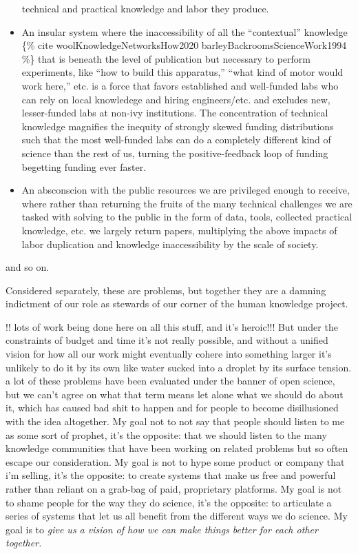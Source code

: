 \documentclass[nohyper]{tufte-book-jls}
\begin{document}
\begin{itemize}
  technical and practical knowledge and labor they produce.
\item
  An insular system where the inaccessibility of all the ``contextual''
  knowledge \{\% cite woolKnowledgeNetworksHow2020
  barleyBackroomsScienceWork1994 \%\} that is beneath the level of
  publication but necessary to perform experiments, like ``how to build
  this apparatus,'' ``what kind of motor would work here,'' etc. is a
  force that favors established and well-funded labs who can rely on
  local knowledege and hiring engineers/etc. and excludes new,
  lesser-funded labs at non-ivy institutions. The concentration of
  technical knowledge magnifies the inequity of strongly skewed funding
  distributions such that the most well-funded labs can do a completely
  different kind of science than the rest of us, turning the
  positive-feedback loop of funding begetting funding ever faster.
\item
  An absconscion with the public resources we are privileged enough to
  receive, where rather than returning the fruits of the many technical
  challenges we are tasked with solving to the public in the form of
  data, tools, collected practical knowledge, etc. we largely return
  papers, multiplying the above impacts of labor duplication and
  knowledge inaccessibility by the scale of society.
\end{itemize}

and so on.

Considered separately, these are problems, but together they are a
damning indictment of our role as stewards of our corner of the human
knowledge project.

!! lots of work being done here on all this stuff, and it's heroic!!!
But under the constraints of budget and time it's not really possible,
and without a unified vision for how all our work might eventually
cohere into something larger it's unlikely to do it by its own like
water sucked into a droplet by its surface tension. a lot of these
problems have been evaluated under the banner of open science, but we
can't agree on what that term means let alone what we should do about
it, which has caused bad shit to happen and for people to become
disillusioned with the idea altogether. My goal not to not say that
people should listen to me as some sort of prophet, it's the opposite:
that we should listen to the many knowledge communities that have been
working on related problems but so often escape our consideration. My
goal is not to hype some product or company that i'm selling, it's the
opposite: to create systems that make us free and powerful rather than
reliant on a grab-bag of paid, proprietary platforms. My goal is not to
shame people for the way they do science, it's the opposite: to
articulate a series of systems that let us all benefit from the
different ways we do science. My goal is to \emph{give us a vision of
how we can make things better for each other together.}
\end{document}
